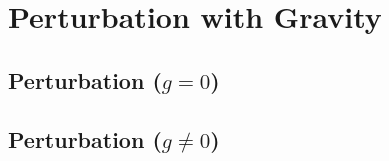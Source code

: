 \section{Perturbation with Gravity}

\subsection{Perturbation ($g=0$)}

\subsection{Perturbation ($g \neq 0$)}

